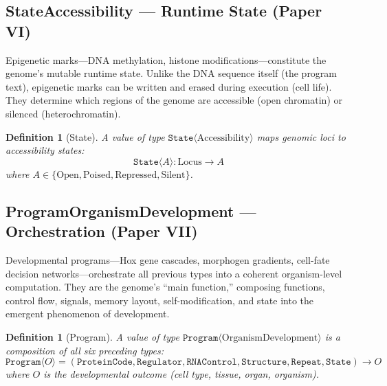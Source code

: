 \documentclass[12pt,a4paper]{article}
\newtheorem{definition}[theorem]{Definition}
\newcommand{\ty}[1]{\texttt{#1}}
\begin{document}
\subsection{State\textlangle Accessibility\textrangle{} --- Runtime State (Paper VI)}

Epigenetic marks---DNA methylation, histone modifications---constitute the genome's mutable runtime state. Unlike the DNA sequence itself (the program text), epigenetic marks can be written and erased during execution (cell life). They determine which regions of the genome are accessible (open chromatin) or silenced (heterochromatin).

\begin{definition}[State]
A value of type $\ty{State}\langle \text{Accessibility} \rangle$ maps genomic loci to accessibility states:
\[
\ty{State}\langle A \rangle : \text{Locus} \to A
\]
where $A \in \{\text{Open}, \text{Poised}, \text{Repressed}, \text{Silent}\}$.
\end{definition}

\subsection{Program\textlangle OrganismDevelopment\textrangle{} --- Orchestration (Paper VII)}

Developmental programs---Hox gene cascades, morphogen gradients, cell-fate decision networks---orchestrate all previous types into a coherent organism-level computation. They are the genome's ``main function,'' composing functions, control flow, signals, memory layout, self-modification, and state into the emergent phenomenon of development.

\begin{definition}[Program]
A value of type $\ty{Program}\langle \text{OrganismDevelopment} \rangle$ is a composition of all six preceding types:
\[
\ty{Program}\langle O \rangle = (\ty{ProteinCode}, \ty{Regulator}, \ty{RNAControl}, \ty{Structure}, \ty{Repeat}, \ty{State}) \to O
\]
where $O$ is the developmental outcome (cell type, tissue, organ, organism).
\end{definition}
\end{document}
